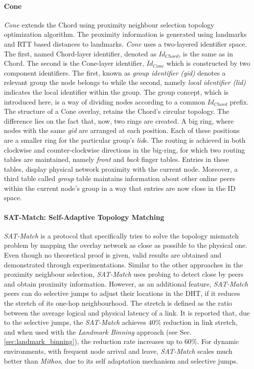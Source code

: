 \documentclass[acmcsur]{acmtrans2m}
\begin{document}
\paragraph*{\bf Cone}

\textit{Cone}\cite{wang_cone_2007} extends the Chord using proximity neighbour selection
topology optimization algorithm. The proximity information is generated using
landmarks and RTT based distances to landmarks.  \textit{Cone} uses a two-layered
identifier space. The first, named Chord-layer identifier, denoted as
$Id_{Chord}$, is the same as in Chord. The second is the Cone-layer
identifier, $Id_{Cone}$ which is constructed by two component identifiers. The
first, known as \emph{group identifier (gid)} denotes a relevant group the node
belongs to while the second, namely \emph{local identifier (lid)} indicates the
local identifier within the group. The group concept, which is introduced here,
is a way of dividing nodes according to a common $Id_{Chord}$ prefix.  The
structure of a Cone overlay, retains the Chord's circular topology. The difference
lies on the fact that, now, two rings are created. A big ring, where nodes with
the same \emph{gid} are arranged at each position. Each of these positions are a
smaller ring for the particular group's \emph{lid}s. The routing is achieved in
both clockwise and counter-clockwise directions in the big-ring, for which two
routing tables are maintained, namely \emph{front} and \emph{back} finger
tables. Entries in these tables, display physical network
proximity with the current node. Moreover, a third table called \emph{group}
table maintains information about other online peers within the current node's
group in a way that entries are now close in the ID space.

\paragraph*{\bf SAT-Match: Self-Adaptive Topology Matching}

\textit{SAT-Match} \cite{ren_satmatch_2004} is a protocol that specifically
tries to solve the topology mismatch problem by mapping the overlay network as
close as possible to the physical one. Even though no theoretical proof is
given, valid results are obtained and demonstrated through experimentations.
Similar to the other approaches in the proximity neighbour selection,
\textit{SAT-Match} uses probing to detect close by peers and obtain proximity
information. However, as an additional feature, \textit{SAT-Match} peers can do
selective jumps to adjust their locations in the DHT, if it reduces the stretch
of its one-hop neighbourhood. The stretch is defined as the ratio between the
average logical and physical latency of a link. It is reported that, due to the
selective jumps, the \textit{SAT-Match} achieves $40\%$ reduction in link
stretch, and when used with the \textit{Landmark Binning} approach (see Sec.
\ref{sec:landmark_binning}), the reduction rate increases up to $60\%$.
For dynamic environments, with frequent node arrival and leave,
\textit{SAT-Match} scales much better than \textit{Mithos}, due to its self
adaptation mechanism and selective jumps.
\end{document}
